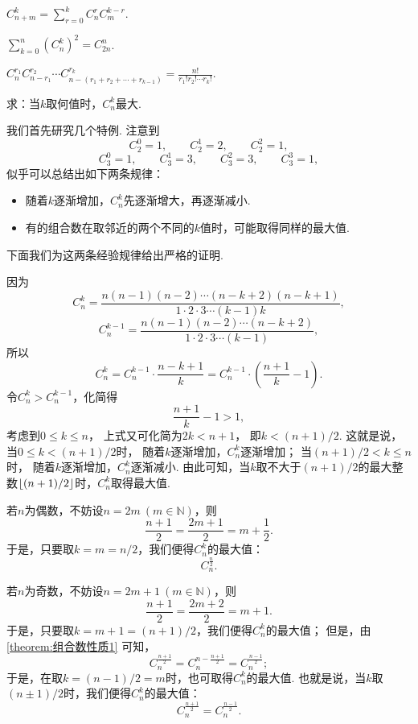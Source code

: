 \begin{property}\label{theorem:组合数性质7}
\(C_{n+m}^k = \sum_{r=0}^{k} C_n^r C_m^{k-r}\).
\end{property}

\begin{property}\label{theorem:组合数性质8}
\(\sum_{k=0}^n (C_n^k)^2 = C_{2n}^n\).
\end{property}

\begin{property}\label{theorem:组合数性质9}
\(C_n^{r_1} C_{n-r_1}^{r_2} \dotsm C_{n-(r_1+r_2+\dotsb+r_{k-1})}^{r_k}
= \frac{n!}{r_1! r_2! \dotsm r_k!}\).
\end{property}

\begin{example}
求：当\(k\)取何值时，\(C_n^k\)最大.
\begin{solution}
我们首先研究几个特例.
注意到\[
	C_2^0 = 1, \qquad
	C_2^1 = 2, \qquad
	C_2^2 = 1,
\]\[
	C_3^0 = 1, \qquad
	C_3^1 = 3, \qquad
	C_3^2 = 3, \qquad
	C_3^3 = 1,
\]
似乎可以总结出如下两条规律：
\begin{itemize}
	\item 随着\(k\)逐渐增加，\(C_n^k\)先逐渐增大，再逐渐减小.
	\item 有的组合数在取邻近的两个不同的\(k\)值时，可能取得同样的最大值.
\end{itemize}
下面我们为这两条经验规律给出严格的证明.

因为\[
	C_n^k = \frac{n(n-1)(n-2)\dotsm(n-k+2)(n-k+1)}{1\cdot2\cdot3\dotsm(k-1)k},
\]\[
	C_n^{k-1} = \frac{n(n-1)(n-2)\dotsm(n-k+2)}{1\cdot2\cdot3\dotsm(k-1)},
\]
所以\[
	C_n^k = C_n^{k-1} \cdot \frac{n-k+1}{k}
	= C_n^{k-1} \cdot \left( \frac{n+1}{k} - 1 \right).
\]
令\(C_n^k > C_n^{k-1}\)，化简得\[
	\frac{n+1}{k} - 1 > 1,
\]
考虑到\(0 \leq k \leq n\)，
上式又可化简为\(2k < n+1\)，
即\(k < (n+1)/2\).
这就是说，当\(0 \leq k < (n+1)/2\)时，
随着\(k\)逐渐增加，\(C_n^k\)逐渐增加；
当\((n+1)/2 < k \leq n\)时，
随着\(k\)逐渐增加，\(C_n^k\)逐渐减小.
由此可知，当\(k\)取不大于\((n+1)/2\)的最大整数\(\lfloor(n+1)/2\rfloor\)时，\(C_n^k\)取得最大值.

若\(n\)为偶数，不妨设\(n = 2m\ (m\in\mathbb{N})\)，则\[
	\frac{n+1}{2} = \frac{2m+1}{2}
	= m+\frac{1}{2}.
\]
于是，只要取\(k = m = n/2\)，我们便得\(C_n^k\)的最大值：\[
	C_n^{\frac{n}{2}}.
\]

若\(n\)为奇数，不妨设\(n = 2m+1\ (m\in\mathbb{N})\)，则\[
	\frac{n+1}{2} = \frac{2m+2}{2} = m+1.
\]
于是，只要取\(k = m+1 = (n+1)/2\)，我们便得\(C_n^k\)的最大值；
但是，由\cref{theorem:组合数性质1} 可知，\[
	C_n^{\frac{n+1}{2}}
	= C_n^{n-\frac{n+1}{2}}
	= C_n^{\frac{n-1}{2}};
\]
于是，在取\(k = (n-1)/2 = m\)时，也可取得\(C_n^k\)的最大值.
也就是说，当\(k\)取\((n\pm1)/2\)时，我们便得\(C_n^k\)的最大值：\[
	C_n^{\frac{n+1}{2}}
	= C_n^{\frac{n-1}{2}}.
\]
\end{solution}
\end{example}

